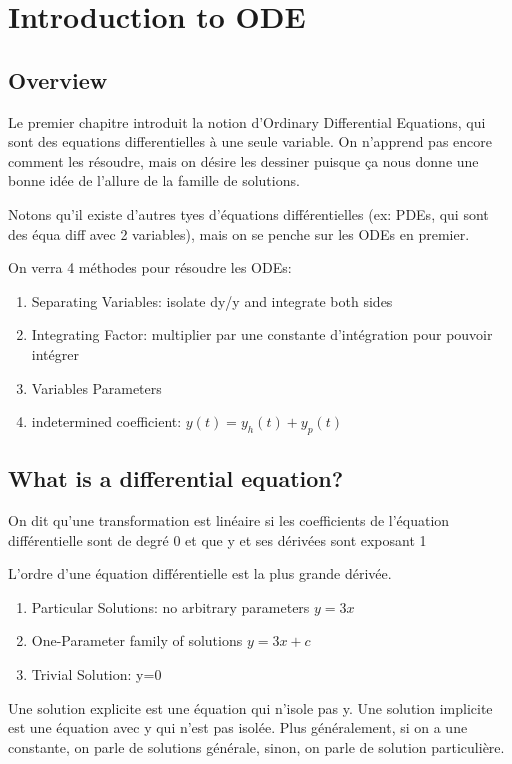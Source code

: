 \documentclass{article}
\begin{document}
\pagebreak

\section{Introduction to ODE}
\subsection*{Overview}

Le premier chapitre introduit la notion d'Ordinary Differential Equations,
qui sont des equations differentielles à une seule variable. On
n'apprend pas encore comment les résoudre, mais on désire les dessiner
puisque ça nous donne une bonne idée de l'allure de la famille de solutions.

Notons qu'il existe d'autres tyes d'équations différentielles (ex:
PDEs, qui sont des équa diff avec 2 variables), mais on se penche sur les
ODEs en premier.

On verra 4 méthodes pour résoudre les ODEs:
\begin{enumerate}
    \item Separating Variables: isolate dy/y and integrate both sides
    \item Integrating Factor: multiplier par une constante d'intégration
	pour pouvoir intégrer
    \item Variables Parameters
    \item indetermined coefficient: $ y(t) = y_h(t) + y_p(t) $

\end{enumerate}

\subsection{What is a differential equation? }

\begin{definition}
    On dit qu'une transformation est linéaire si les coefficients de
    l'équation différentielle sont de degré 0 et que y et ses dérivées
    sont exposant 1
\end{definition}

\begin{definition}
    L'ordre d'une équation différentielle est la plus grande dérivée.
\end{definition}

\begin{definition}
    \begin{enumerate}
        \item Particular Solutions: no arbitrary parameters $ y = 3x$
	\item One-Parameter family of solutions $ y=3x+c$
	\item Trivial Solution: y=0
    \end{enumerate}
    Une solution explicite est une équation qui n'isole pas y. Une solution
    implicite est une équation avec y qui n'est pas isolée.
    Plus généralement, si on a une constante, on parle de solutions
    générale, sinon, on parle de solution particulière.
\end{definition}
\end{document}
